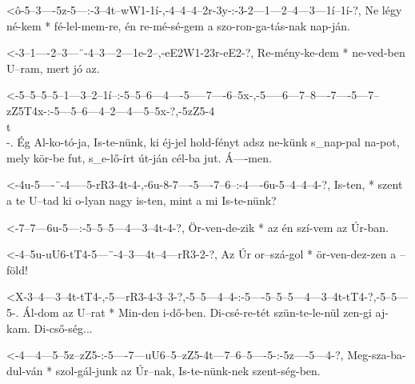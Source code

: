   {<ô-5--3----5z-5---:-3--4t--wW1-1í-,-4--4--4--2r-3y-:-3-2---1---2--4---3---1í--1í-?,}
  {   Ne légy né-kem * fé-lel-mem-re,  én re-mé-sé-gem  a szo-ron-ga-tás-nak nap-ján.}

  {<-3--1----2--3---¨-4--3---2---1e-2--,-eE2W1-23r-eE2-?,}
  {  Re-mény-ke-dem * ne-ved-ben U--ram, mert  jó  az.}


  {<-5--5--5--5--1---3--2--1í--:-5--5--6---4----5-----7----6--5x-,-5-----6---7--8----7----5---7--zZ5T4x-:-5---5--6---4--2---4---5--5x-?,-5zZ5-4\\t\\-.}
  {  Ég Al-ko-tó-ja, Is-te-nünk, ki éj-jel hold-fényt adsz ne-künk s_nap-pal na-pot, mely kör-be fut,     s_e-lő-írt út-ján cél-ba jut.  Á----men.}

  {<-4u-5----¨-4-----5-rR3-4t-4-,-6u-8-7----5----7--6--:-4----6u-5--4--4--4-?,}
  {  Is-ten, * szent a te  U--tad ki o-lyan nagy is-ten, mint a  mi Is-te-nünk?}

  {<-7--7---6u-5---:-5--5--5---4---3--4t-4-?,}
  {  Ör-ven-de-zik * az én szí-vem az Úr-ban.}

  {<-4--5u-uU6-tT4-5---¨-4--3---4t--4---rR3-2-?,}
  {  Az Úr or--szá-gol * ör-ven-dez-zen a --föld!}

  {<X-3--4---3--4t-tT4-,-5---rR3-4-3--3-?,-5--5---4--4-:-5----5--5--5---4---3--4t-tT4-?,-5--5---5-.}
  {   Ál-dom az U--rat * Min-den i-dő-ben. Di-csé-re-tét szün-te-le-nül zen-gi aj-kam.   Di-cső-ség...}

  {<-4---4---5--5z--zZ5-:-5----7---uU6--5--zZ5-4t---7--6--5----5-:-5z----5---4-?,}
  {  Meg-sza-ba-dul-ván * szol-gál-junk az Úr--nak, Is-te-nünk-nek szent-ség-ben.}



